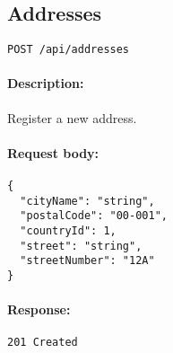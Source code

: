 \documentclass[a4paper,11pt]{article}
\begin{document}
\subsection{Addresses}
\label{sec:geography-addresses}
\begin{verbatim}
POST /api/addresses
\end{verbatim}
\paragraph{Description:} Register a new address.
\paragraph{Request body:}
\begin{verbatim}
{
  "cityName": "string",
  "postalCode": "00-001",
  "countryId": 1,
  "street": "string",
  "streetNumber": "12A"
}
\end{verbatim}
\paragraph{Response:} \texttt{201 Created}
\end{document}
